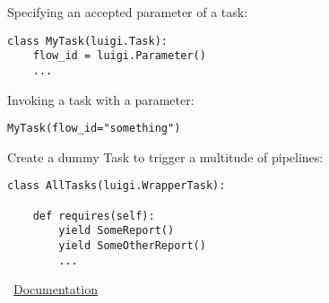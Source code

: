 \documentclass[twocolumn,8pt]{article}
\begin{document}
\begin{mdframed}[frametitle=Passing parameters to tasks]
Specifying an accepted parameter of a task:
\begin{lstlisting}
class MyTask(luigi.Task):
    flow_id = luigi.Parameter()
    ...
\end{lstlisting}

Invoking a task with a parameter:
\begin{lstlisting}
MyTask(flow_id="something")
\end{lstlisting}
\end{mdframed}

\begin{mdframed}[frametitle=Wrappers]
Create a dummy Task to trigger a multitude of pipelines:
\begin{lstlisting}
class AllTasks(luigi.WrapperTask):
    
    def requires(self):
        yield SomeReport()
        yield SomeOtherReport()
        ...    
\end{lstlisting}
\end{mdframed}

\begin{mdframed}[frametitle=Resources]
\faExternalLink\ \href{https://readthedocs.org/projects/luigi/downloads/pdf/latest/}{Documentation}

\ 

\end{mdframed}    
\end{document}
